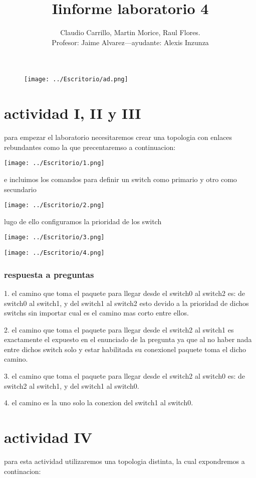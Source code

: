 \documentclass[11pt,a4paper]{report}
\author{Claudio Carrillo, Martin Morice, Raul Flores. \\ Profesor: Jaime Alvarez---ayudante: Alexis Inzunza}
\title{Iinforme laboratorio 4}
\begin{document}
\begin{figure}[hbtp]
\texttt{[image: ../Escritorio/ad.png]}
\end{figure}

\maketitle
\part{actividad I, II y III}
	para empezar el laboratorio necesitaremos crear una topologia con enlaces rebundantes como la que precentaremso a continuacion:
	
\texttt{[image: ../Escritorio/1.png]} 
	
	e incluimos los comandos para definir un switch como primario y otro como secundario 
	
\texttt{[image: ../Escritorio/2.png]} 	

	lugo de ello configuramos la prioridad de los switch 
	
\texttt{[image: ../Escritorio/3.png]} 

\texttt{[image: ../Escritorio/4.png]} 
  
\section{respuesta a preguntas}

1.	el camino que toma el paquete para llegar desde el switch0 al switch2 es: de switch0 al switch1, y del switch1 al switch2 esto devido a la prioridad de dichos switchs sin importar cual es el camino mas corto entre ellos.

2.	el camino que toma el paquete para llegar desde el switch2 al switch1 es exactamente el expuesto en el enunciado de la pregunta ya que al no haber nada entre dichos switch solo y estar habilitada su conexionel paquete toma el dicho camino.

3.	el camino que toma el paquete para llegar desde el switch2 al switch0 es: de switch2 al switch1, y del switch1 al switch0.

4.	el camino es la uno solo la conexion del switch1 al switch0.

\part{actividad IV}
	para esta actividad utilizaremos una topologia distinta, la cual expondremos a continacion:
	
\end{document}
